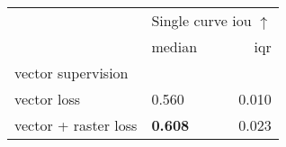 \begin{tabular}{llr}
\toprule
 & \multicolumn{2}{c}{Single curve \acrshort{iou} $\uparrow$} \\
 & median & \acrshort{iqr} \\
vector supervision &  &  \\
\midrule
vector loss & 0.560 & 0.010 \\
vector + raster loss & \textbf{0.608} & 0.023 \\
\bottomrule
\end{tabular}
